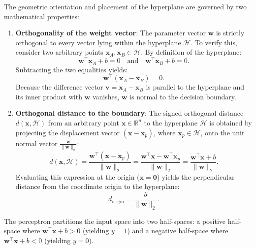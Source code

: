 \documentclass[../../../main.tex]{subfiles}
\begin{document}
The geometric orientation and placement of the hyperplane are governed by two mathematical properties:
\begin{enumerate}[label=(\roman*)]
    \item \textbf{Orthogonality of the weight vector}: The parameter vector $\mathbf{w}$ is strictly orthogonal to every vector lying within the hyperplane $\mathcal{H}$. To verify this, consider two arbitrary points $\mathbf{x}_A, \mathbf{x}_B \in \mathcal{H}$. By definition of the hyperplane:
    \begin{equation}
    \mathbf{w}^\top \mathbf{x}_A + b = 0 \quad \text{and} \quad \mathbf{w}^\top \mathbf{x}_B + b = 0.
    \end{equation}
    Subtracting the two equalities yields:
    \begin{equation}
    \mathbf{w}^\top \left(\mathbf{x}_A - \mathbf{x}_B\right) = 0.
    \end{equation}
    Because the difference vector $\mathbf{v} = \mathbf{x}_A - \mathbf{x}_B$ is parallel to the hyperplane and its inner product with $\mathbf{w}$ vanishes, $\mathbf{w}$ is normal to the decision boundary.
    \item \textbf{Orthogonal distance to the boundary}: The signed orthogonal distance $d(\mathbf{x}, \mathcal{H})$ from an arbitrary point $\mathbf{x} \in \mathbb{R}^n$ to the hyperplane $\mathcal{H}$ is obtained by projecting the displacement vector $(\mathbf{x} - \mathbf{x}_p)$, where $\mathbf{x}_p \in \mathcal{H}$, onto the unit normal vector $\frac{\mathbf{w}}{\|\mathbf{w}\|_2}$:
    \begin{equation}
    d(\mathbf{x}, \mathcal{H}) = \frac{\mathbf{w}^\top (\mathbf{x} - \mathbf{x}_p)}{\|\mathbf{w}\|_2} = \frac{\mathbf{w}^\top \mathbf{x} - \mathbf{w}^\top \mathbf{x}_p}{\|\mathbf{w}\|_2} = \frac{\mathbf{w}^\top \mathbf{x} + b}{\|\mathbf{w}\|_2}.
    \end{equation}
    Evaluating this expression at the origin ($\mathbf{x} = \mathbf{0}$) yields the perpendicular distance from the coordinate origin to the hyperplane:
    \begin{equation}
    d_{\text{origin}} = \frac{|b|}{\|\mathbf{w}\|_2}.
    \end{equation}
\end{enumerate}
The perceptron partitions the input space into two half-spaces: a positive half-space where $\mathbf{w}^\top \mathbf{x} + b > 0$ (yielding $y = 1$) and a negative half-space where $\mathbf{w}^\top \mathbf{x} + b < 0$ (yielding $y = 0$).
\end{document}
